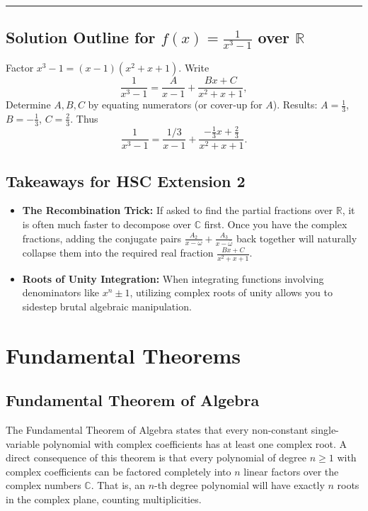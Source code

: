 \documentclass[12pt]{article}
\begin{document}
\vspace{0.3cm}
\hrule

\subsection{Solution Outline for $f(x)=\frac{1}{x^{3}-1}$ over $\mathbb{R}$}
Factor $x^{3}-1=(x-1)(x^{2}+x+1)$.
Write
\[
\frac{1}{x^{3}-1}= \frac{A}{x-1}+\frac{Bx+C}{x^{2}+x+1},
\]
Determine $A,B,C$ by equating numerators (or cover‑up for $A$). Results: $A=\tfrac13$, $B=-\tfrac13$, $C=\tfrac23$.
Thus
\[
\frac{1}{x^{3}-1}= \frac{1/3}{x-1}+\frac{-\tfrac13 x+\tfrac23}{x^{2}+x+1}.
\]
\vspace{0.3cm}

\subsection{Takeaways for HSC Extension 2}
\begin{itemize}
    \item \textbf{The Recombination Trick:} If asked to find the partial fractions over $\mathbb{R}$, it is often much faster to decompose over $\mathbb{C}$ first. Once you have the complex fractions, adding the conjugate pairs $\frac{A_2}{x-\omega} + \frac{A_3}{x-\bar{\omega}}$ back together will naturally collapse them into the required real fraction $\frac{Bx+C}{x^2+x+1}$.
    \item \textbf{Roots of Unity Integration:} When integrating functions involving denominators like $x^n \pm 1$, utilizing complex roots of unity allows you to sidestep brutal algebraic manipulation.
\end{itemize}

\section{Fundamental Theorems}

\subsection{Fundamental Theorem of Algebra}
The Fundamental Theorem of Algebra states that every non-constant single-variable polynomial with complex coefficients has at least one complex root. A direct consequence of this theorem is that every polynomial of degree $n \ge 1$ with complex coefficients can be factored completely into $n$ linear factors over the complex numbers $\mathbb{C}$. That is, an $n$-th degree polynomial will have exactly $n$ roots in the complex plane, counting multiplicities.
\end{document}
